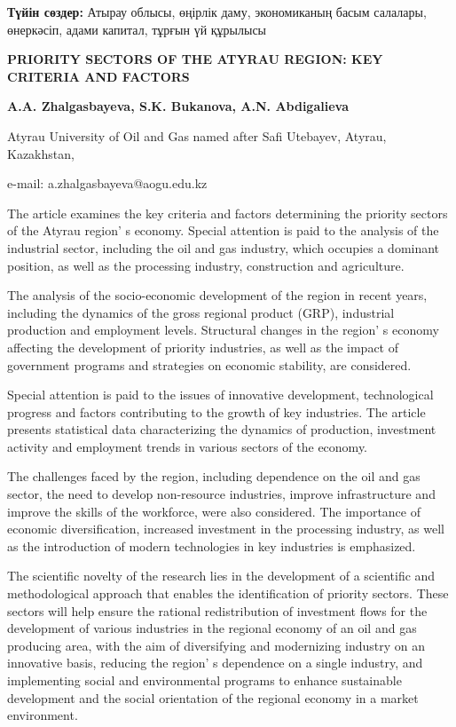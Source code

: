 {\bfseries Түйін сөздер:} Атырау облысы, өңірлік даму, экономиканың басым
салалары, өнеркәсіп, адами капитал, тұрғын үй құрылысы
\newpage
\begin{articleheader}
{\bfseries PRIORITY SECTORS OF THE ATYRAU REGION: KEY CRITERIA AND FACTORS}

{\bfseries
A.A. Zhalgasbayeva\textsuperscript{\envelope },
S.K. Bukanova,
A.N. Abdigalieva
}
\end{articleheader}

\begin{affiliation}
Atyrau University of Oil and Gas named after Safi Utebayev, Atyrau, Kazakhstan,

e-mail: a.zhalgasbayeva@aogu.edu.kz
\end{affiliation}

The article examines the key criteria and factors determining the
priority sectors of the Atyrau region' s economy. Special
attention is paid to the analysis of the industrial sector, including
the oil and gas industry, which occupies a dominant position, as well as
the processing industry, construction and agriculture.

The analysis of the socio-economic development of the region in recent
years, including the dynamics of the gross regional product (GRP),
industrial production and employment levels. Structural changes in the
region' s economy affecting the development of priority
industries, as well as the impact of government programs and strategies
on economic stability, are considered.

Special attention is paid to the issues of innovative development,
technological progress and factors contributing to the growth of key
industries. The article presents statistical data characterizing the
dynamics of production, investment activity and employment trends in
various sectors of the economy.

The challenges faced by the region, including dependence on the oil and
gas sector, the need to develop non-resource industries, improve
infrastructure and improve the skills of the workforce, were also
consid\-ered. The importance of economic diversification, increased
investment in the processing industry, as well as the introduction of
modern technologies in key industries is emphasized.

The scientific novelty of the research lies in the development of a
scientific and methodological approach that enables the identification
of priority sectors. These sectors will help ensure the rational
redistribution of investment flows for the development of various
industries in the regional economy of an oil and gas producing area,
with the aim of diversifying and modernizing industry on an innovative
basis, reducing the region' s dependence on a single
industry, and implementing social and environmental programs to enhance
sustainable development and the social orientation of the regional
economy in a market environment.

